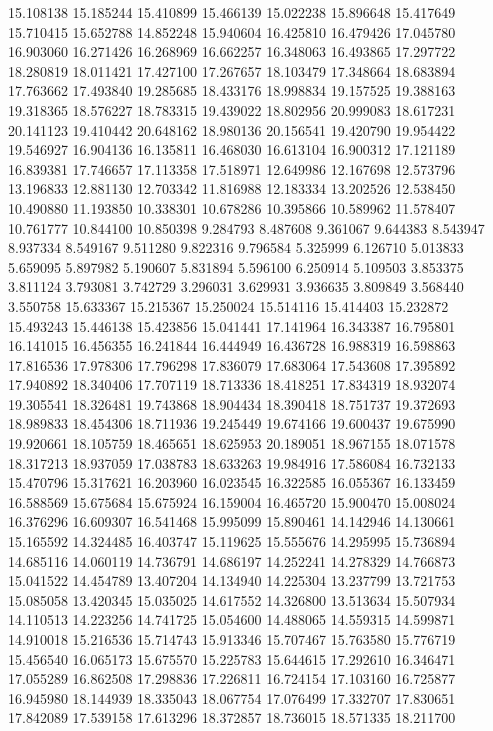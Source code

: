15.108138
15.185244
15.410899
15.466139
15.022238
15.896648
15.417649
15.710415
15.652788
14.852248
15.940604
16.425810
16.479426
17.045780
16.903060
16.271426
16.268969
16.662257
16.348063
16.493865
17.297722
18.280819
18.011421
17.427100
17.267657
18.103479
17.348664
18.683894
17.763662
17.493840
19.285685
18.433176
18.998834
19.157525
19.388163
19.318365
18.576227
18.783315
19.439022
18.802956
20.999083
18.617231
20.141123
19.410442
20.648162
18.980136
20.156541
19.420790
19.954422
19.546927
16.904136
16.135811
16.468030
16.613104
16.900312
17.121189
16.839381
17.746657
17.113358
17.518971
12.649986
12.167698
12.573796
13.196833
12.881130
12.703342
11.816988
12.183334
13.202526
12.538450
10.490880
11.193850
10.338301
10.678286
10.395866
10.589962
11.578407
10.761777
10.844100
10.850398
9.284793
8.487608
9.361067
9.644383
8.543947
8.937334
8.549167
9.511280
9.822316
9.796584
5.325999
6.126710
5.013833
5.659095
5.897982
5.190607
5.831894
5.596100
6.250914
5.109503
3.853375
3.811124
3.793081
3.742729
3.296031
3.629931
3.936635
3.809849
3.568440
3.550758
15.633367
15.215367
15.250024
15.514116
15.414403
15.232872
15.493243
15.446138
15.423856
15.041441
17.141964
16.343387
16.795801
16.141015
16.456355
16.241844
16.444949
16.436728
16.988319
16.598863
17.816536
17.978306
17.796298
17.836079
17.683064
17.543608
17.395892
17.940892
18.340406
17.707119
18.713336
18.418251
17.834319
18.932074
19.305541
18.326481
19.743868
18.904434
18.390418
18.751737
19.372693
18.989833
18.454306
18.711936
19.245449
19.674166
19.600437
19.675990
19.920661
18.105759
18.465651
18.625953
20.189051
18.967155
18.071578
18.317213
18.937059
17.038783
18.633263
19.984916
17.586084
16.732133
15.470796
15.317621
16.203960
16.023545
16.322585
16.055367
16.133459
16.588569
15.675684
15.675924
16.159004
16.465720
15.900470
15.008024
16.376296
16.609307
16.541468
15.995099
15.890461
14.142946
14.130661
15.165592
14.324485
16.403747
15.119625
15.555676
14.295995
15.736894
14.685116
14.060119
14.736791
14.686197
14.252241
14.278329
14.766873
15.041522
14.454789
13.407204
14.134940
14.225304
13.237799
13.721753
15.085058
13.420345
15.035025
14.617552
14.326800
13.513634
15.507934
14.110513
14.223256
14.741725
15.054600
14.488065
14.559315
14.599871
14.910018
15.216536
15.714743
15.913346
15.707467
15.763580
15.776719
15.456540
16.065173
15.675570
15.225783
15.644615
17.292610
16.346471
17.055289
16.862508
17.298836
17.226811
16.724154
17.103160
16.725877
16.945980
18.144939
18.335043
18.067754
17.076499
17.332707
17.830651
17.842089
17.539158
17.613296
18.372857
18.736015
18.571335
18.211700
